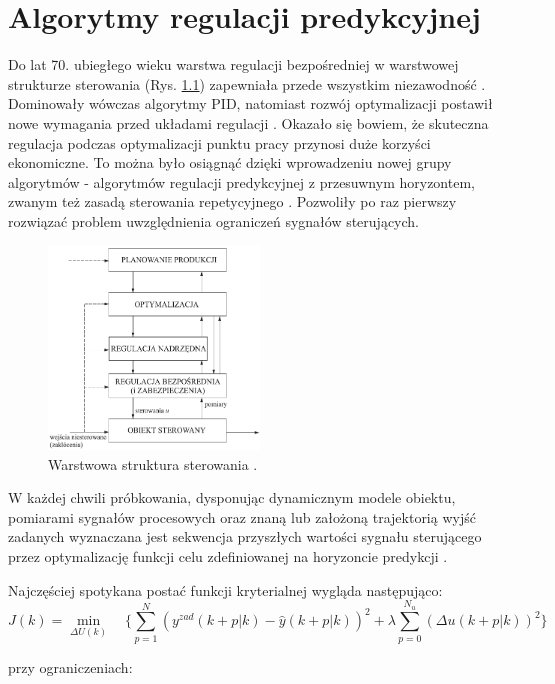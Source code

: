 \chapter{Algorytmy regulacji predykcyjnej}
Do lat 70. ubiegłego wieku warstwa regulacji bezpośredniej w warstwowej strukturze sterowania (Rys. \ref{warstwy}) zapewniała przede wszystkim niezawodność \cite{120}. Dominowały wówczas algorytmy PID, natomiast rozwój optymalizacji postawił nowe wymagania przed układami regulacji \cite{160}. Okazało się bowiem, że skuteczna regulacja podczas optymalizacji punktu pracy przynosi duże korzyści ekonomiczne. To można było osiągnąć dzięki wprowadzeniu nowej grupy algorytmów - algorytmów regulacji predykcyjnej z przesuwnym horyzontem, zwanym też zasadą sterowania repetycyjnego \cite{160}. Pozwoliły po raz pierwszy rozwiązać problem uwzględnienia ograniczeń sygnałów sterujących.

\begin{figure}[h!]
\centering
\includegraphics[width=0.5\textwidth]{pictures/warstwy}
\caption{Warstwowa struktura sterowania \cite{121}.}
\label{warstwy}
\end{figure}

W każdej chwili próbkowania, dysponując dynamicznym modele obiektu, pomiarami sygnałów procesowych oraz znaną lub założoną trajektorią wyjść zadanych wyznaczana jest sekwencja przyszłych wartości sygnału sterującego przez optymalizację funkcji celu zdefiniowanej na horyzoncie predykcji \cite{40}.

Najczęściej spotykana postać funkcji kryterialnej wygląda następująco:
\begin{equation}
J(k) = \min_{\Delta U(k)} \quad \{\sum_{p=1}^N (y^{zad}(k+p|k) - \hat{y}(k+p|k))^2 + \lambda \sum_{p=0}^{N_u} (\Delta u(k+p|k))^2\}
\end{equation}

przy ograniczeniach:

